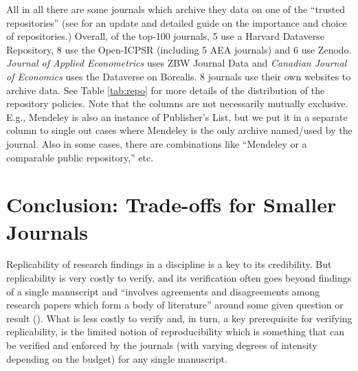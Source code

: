 \documentclass[11pt]{article}
\begin{document}
All in all there are some journals which archive they data on one of the ``trusted repositories'' (see \cite{connolly2023journal} for an update and detailed guide on the importance and choice of repositories.) Overall, of the top-100 journals, 5 use a Harvard Dataverse Repository, 8 use the Open-ICPSR (including 5 AEA journals) and 6 use Zenodo. \textit{Journal of Applied Econometrics} uses ZBW Journal Data and \textit{Canadian Journal of Economics} uses the Dataverse on Borealis. 8 journals use their own websites to archive data. See Table \ref{tab:repo} for more details of the distribution of the repository policies. Note that the columns are not necessarily mutually exclusive. E.g., Mendeley is also an instance of Publisher's List, but we put it in a separate column to single out cases where Mendeley is the only archive named/used by the journal. Also in some cases, there are combinations like ``Mendeley or a comparable public repository,'' etc.\\





\newpage
\section{Conclusion: Trade-offs for Smaller Journals}
\label{conc}
Replicability of research findings in a discipline is a key to its credibility. But replicability is very costly to verify, and its verification often goes beyond findings of a single manuscript and ``involves agreements and disagreements among research papers which form a body of literature'' around some given question or result (\cite{vilhuber2023reproducibility}). What is less costly to verify and, in turn, a key prerequisite for verifying replicability, is the limited notion of reproducibility which is something that can be verified and enforced by the journals (with varying degrees of intensity depending on the budget) for any single manuscript. \\
\end{document}
